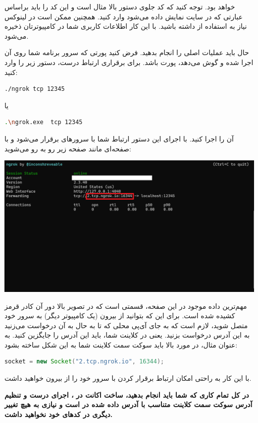 \documentclass[]{article}
\begin{document}
خواهد بود. توجه کنید که کد جلوی دستور بالا مثال است و این کد را باید براساس عبارتی که در سایت نمایش داده می‌شود وارد کنید. همچنین ممکن است در لینوکس نیاز به استفاده از   داشته باشید. با این کار اطلاعات کاربری شما در کامپیوترتان ذخیره می‌شود.


حال باید عملیات اصلی را انجام بدهید. فرض کنید پورتی که سرور برنامه شما روی آن اجرا شده و گوش می‌دهد، پورت  باشد. برای برقراری ارتباط درست، دستور زیر را وارد کنید:

\begin{latin}
\begin{lstlisting}[language = bash]
./ngrok tcp 12345
\end{lstlisting}
\end{latin}

یا

\begin{latin}
\begin{lstlisting}[language = bash]
.\ngrok.exe  tcp 12345
\end{lstlisting}
\end{latin}

آن را اجرا کنید. با اجرای این دستور ارتباط شما با سرورهای  برقرار می‌شود و با صفحه‌ای مانند صفحه زیر رو به رو می‌شوید:

 \begin{center}
	\includegraphics[width = 1.0 \textwidth]{images/2.png}
\end{center}

مهم‌ترین داده موجود در این صفحه، قسمتی است که در تصویر بالا دور آن کادر قرمز کشیده‌ شده است. برای این که بتوانید از بیرون (یک کامپیوتر دیگر) به سرور خود متصل شوید، لازم است که به جای آی‌پی محلی   که تا به حال به آن درخواست می‌زنید به این آدرس درخواست بزنید. یعنی در کلاینت شما، باید این آدرس را جایگزین کنید. به عنوان مثال، در مورد بالا باید سوکت سمت کلاینت شما به این شکل ساخته بشود:


\begin{latin}
\begin{lstlisting}[language = java]
socket = new Socket("2.tcp.ngrok.io", 16344);
\end{lstlisting}
\end{latin}

با این کار به راحتی امکان ارتباط برقرار کردن با سرور خود را از بیرون خواهید داشت.


\textbf{
	در کل تمام کاری که شما باید انجام بدهید، ساخت اکانت در ، اجرای درست  و تنظیم آدرس سوکت سمت کلاینت متناسب با آدرس داده شده در  است و نیازی به هیچ تغییر دیگری در کدهای خود نخواهید داشت.}
\end{document}
